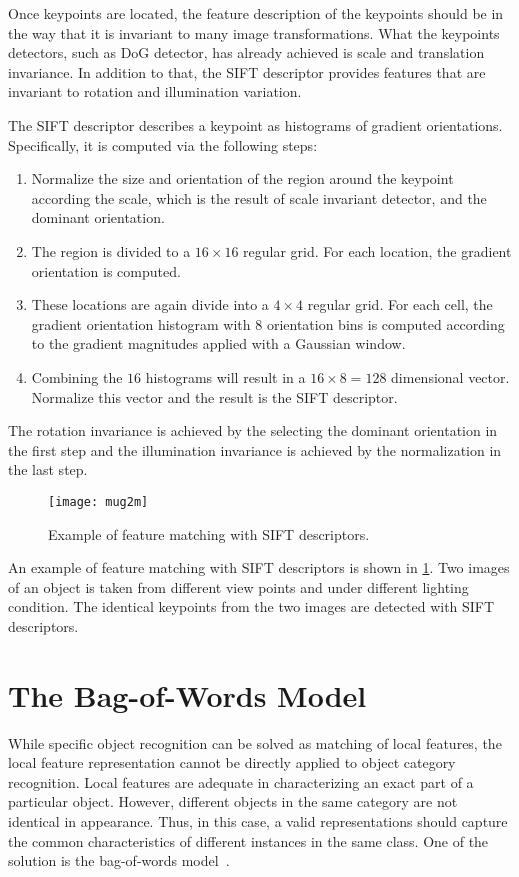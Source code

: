 \documentclass[12pt,final,twoside]{report}
\begin{document}
Once keypoints are located, the feature description of the keypoints should be in the way that it is invariant to many image transformations. What the keypoints detectors, such as DoG detector, has already achieved is scale and translation invariance. In addition to that, the SIFT descriptor provides features that are invariant to rotation and illumination variation.

The SIFT descriptor describes a keypoint as histograms of gradient orientations. Specifically, it is computed via the following steps:
\begin{enumerate}
  \item Normalize the size and orientation of the region around the keypoint according the scale, which is the result of scale invariant detector, and the dominant orientation.
  \item The region is divided to a $16 \times 16$ regular grid. For each location, the gradient orientation is computed.
  \item These locations are again divide into a $4 \times 4$ regular grid. For each cell, the gradient orientation histogram with 8 orientation bins is computed according to the gradient magnitudes applied with a Gaussian window.
  \item Combining the $16$ histograms will result in a $16 \times 8 = 128$ dimensional vector. Normalize this vector and the result is the SIFT descriptor.
\end{enumerate}

The rotation invariance is achieved by the selecting the dominant orientation in the first step and the illumination invariance is achieved by the normalization in the last step.

\begin{figure}[t]
  \centering
  \texttt{[image: mug2m]}
  \caption{Example of feature matching with SIFT descriptors.}
  \label{fig:match}
\end{figure}

An example of feature matching with SIFT descriptors is shown in \cref{fig:match}. Two images of an object is taken from different view points and under different lighting condition. The identical keypoints from the two images are detected with SIFT descriptors.

\section{The Bag-of-Words Model}
While specific object recognition can be solved as matching of local features, the local feature representation cannot be directly applied to object category recognition. Local features are adequate in characterizing an exact part of a particular object. However, different objects in the same category are not identical in appearance. Thus, in this case, a valid representations should capture the common characteristics of different instances in the same class. One of the solution is the bag-of-words model~\cite{csurka_visual_2004}.
\end{document}
